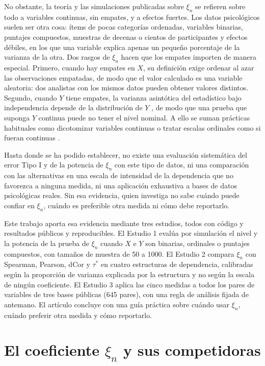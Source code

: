 \documentclass[man,donotrepeattitle,floatsintext]{apa7}
\begin{document}
No obstante, la teoría y las simulaciones publicadas sobre $\xi_n$ se refieren sobre todo a variables continuas, sin empates, y a efectos fuertes. Los datos psicológicos suelen ser otra cosa: ítems de pocas categorías ordenadas, variables binarias, puntajes compuestos, muestras de decenas o cientos de participantes y efectos débiles, en los que una variable explica apenas un pequeño porcentaje de la varianza de la otra. Dos rasgos de $\xi_n$ hacen que los empates importen de manera especial. Primero, cuando hay empates en $X$, su definición exige ordenar al azar las observaciones empatadas, de modo que el valor calculado es una variable aleatoria: dos analistas con los mismos datos pueden obtener valores distintos. Segundo, cuando $Y$ tiene empates, la varianza asintótica del estadístico bajo independencia depende de la distribución de $Y$ \parencite{chatterjee2021}, de modo que una prueba que suponga $Y$ continua puede no tener el nivel nominal. A ello se suman prácticas habituales como dicotomizar variables continuas \parencite{maccallum2002} o tratar escalas ordinales como si fueran continuas \parencite{liddell2018}.

Hasta donde se ha podido establecer, no existe una evaluación sistemática del error Tipo I y de la potencia de $\xi_n$ con este tipo de datos, ni una comparación con las alternativas en una escala de intensidad de la dependencia que no favorezca a ninguna medida, ni una aplicación exhaustiva a bases de datos psicológicas reales. Sin esa evidencia, quien investiga no sabe cuándo puede confiar en $\xi_n$, cuándo es preferible otra medida ni cómo debe reportarlo.

Este trabajo aporta esa evidencia mediante tres estudios, todos con código y resultados públicos y reproducibles. El Estudio 1 evalúa por simulación el nivel y la potencia de la prueba de $\xi_n$ cuando $X$ e $Y$ son binarias, ordinales o puntajes compuestos, con tamaños de muestra de 50 a 1000. El Estudio 2 compara $\xi_n$ con Spearman, Pearson, dCor y $\tau^*$ en cuatro estructuras de dependencia, calibradas según la proporción de varianza explicada por la estructura y no según la escala de ningún coeficiente. El Estudio 3 aplica las cinco medidas a todos los pares de variables de tres bases públicas (645 pares), con una regla de análisis fijada de antemano. El artículo concluye con una guía práctica sobre cuándo usar $\xi_n$, cuándo preferir otra medida y cómo reportarlo.

\section{El coeficiente $\xi_n$ y sus competidoras}
\end{document}
